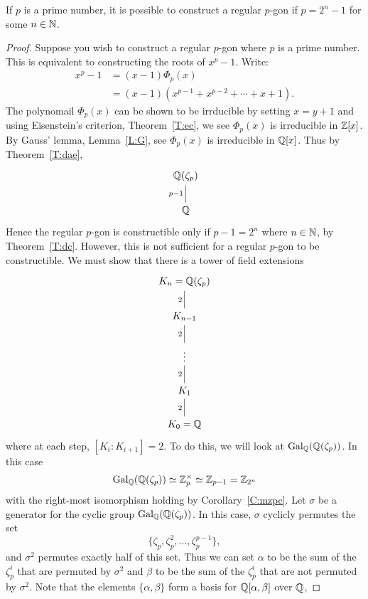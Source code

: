\documentclass{ximera}
\begin{document}
\begin{theorem}
  If $p$ is a prime number, it is possible to construct a regular
  $p$-gon if $p= 2^n-1$ for some $n\in \mathbb N$.
  \begin{proof}
    Suppose you wish to construct a regular $p$-gon where $p$ is a
    prime number. This is equivalent to constructing the roots of
    $x^p-1$. Write:
    \begin{align*}
      x^{p} -1 &= (x-1) \Phi_{p}(x)\\
      &= (x-1)(x^{p-1} + x^{p-2} + \cdots + x+1).
    \end{align*}
    The polynomail $\Phi_{p}(x)$ can be shown to be irrducible by
    setting $x = y+1$ and using Eisenstein's criterion,
    Theorem~\ref{T:ec}, we see $\Phi_{p}(x)$ is irreducible in
    $\mathbb Z[x]$. By Gauss' lemma, Lemma~\ref{L:G}, see $\Phi_{p}(x)$ is
    irreducible in $\mathbb Q[x]$. Thus by Theorem~\ref{T:dae}, 
    \[
    \begin{tikzcd}
      \Q(\zeta_{p})\\
      \Q\ar[u, -, "p-1"]
    \end{tikzcd}
    \]
    Hence the regular $p$-gon is constructible only if $p-1 = 2^n$
    where $n\in \mathbb N$, by Theorem~\ref{T:dc}. However, this is not
    sufficient for a regular $p$-gon to be constructible. We must show
    that there is a tower of field extensions 
    \[
    \begin{tikzcd}
      K_n=\Q(\zeta_{p})\\
      K_{n-1}\ar[u, -, "2"]\\
      \vdots\ar[u, -, "2"]\\
      K_1\ar[u, -, "2"]\\
      K_0=\Q\ar[u, -, "2"]
    \end{tikzcd}
    \]
    where at each step, $[K_i:K_{i+1}]=2$. To do this, we will look at
    $\operatorname{Gal}_\mathbb Q(\mathbb Q(\zeta_p))$. In this case
    \[
    \operatorname{Gal}_\mathbb Q(\mathbb Q(\zeta_p))\simeq\mathbb Z_p^\times \simeq \mathbb Z_{p-1} = \mathbb Z_{2^n}
    \]
    with the right-most isomorphism holding by
    Corollary~\ref{C:mzpc}. Let $\sigma$ be a generator for the cyclic
    group $\operatorname{Gal}_\mathbb Q(\mathbb Q(\zeta_p))$. In this case, $\sigma$ cyclicly permutes the set
    \[
    \{\zeta_p,\zeta_p^2,\dots,\zeta_p^{p-1}\},
    \]
    and $\sigma^2$ permutes exactly half of this set. Thus we can set
    $\alpha$ to be the sum of the $\zeta_p^i$ that are permuted by
    $\sigma^2$ and $\beta$ to be the sum of the $\zeta_p^i$ that are
    not permuted by $\sigma^2$.  Note that the elements
    $\{\alpha,\beta\}$ form a basis for $\mathbb Q[\alpha,\beta]$ over $\mathbb Q$,

\end{proof}
\end{theorem}
\end{document}
